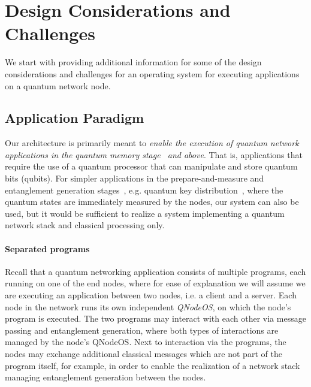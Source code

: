 \section{Design Considerations and Challenges}
\label{sec:design-consid:challenges}

We start with providing additional information for some of the design considerations and challenges for an operating system for executing applications on a quantum network node.

\subsection{Application Paradigm}
\label{sec:design-consid:challenges:application}

Our architecture is primarily meant to \emph{enable the execution of quantum network applications in the quantum memory stage~\cite{wehner_2018_stages} and above}. That is, applications that require the use of a quantum processor that can manipulate and store quantum bits (qubits). For simpler applications in the prepare-and-measure and entanglement generation stages~\cite{wehner_2018_stages}, e.g. quantum key distribution~\cite{bb84Original,ekert_1991_e91}, where the quantum states are immediately measured by the nodes, our system can also be used, but it would be sufficient to realize a system implementing a quantum network stack and classical processing only.

\paragraph{Separated programs}

Recall that a quantum networking application consists of multiple programs, each running on one of the end nodes, where for ease of explanation we will assume we are executing an application between two nodes, i.e. a client and a server. Each node in the network runs its own independent \emph{\ac{QNodeOS}}, on which the node's program is executed. The two programs may interact with each other via message passing and entanglement generation, where both types of interactions are managed by the node's \ac{QNodeOS}. Next to interaction via the programs, the nodes may exchange additional classical messages which are not part of the program itself, for example, in order to enable the realization of a network stack~\cite{dahlberg_2019_egp} managing entanglement generation between the nodes.

